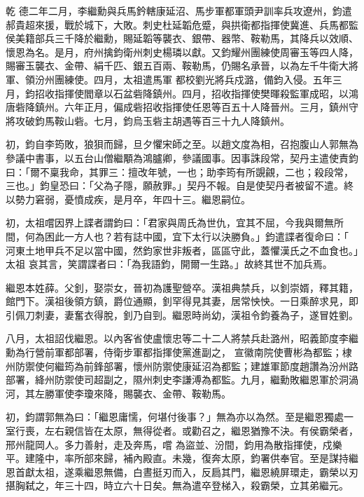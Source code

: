 \begin{pinyinscope}
 乾
 德二年二月，李繼勳與兵馬鈐轄康延沼、馬步軍都軍頭尹訓率兵攻遼州，鈞遣郝貴超來援，戰於城下，大敗。刺史杜延韜危蹙，與拱衛都指揮使冀進、兵馬都監侯美籍部兵三千降於繼勳，賜延韜等襲衣、銀帶、器幣、鞍勒馬，其降兵以效順、懷恩為名。是月，府州擒鈞衛州刺史楊璘以獻。又鈞耀州團練使周審玉等四人降，賜審玉襲衣、金帶、絹千匹、銀五百兩、鞍勒馬，仍賜名承晉，以為左千牛衛大將軍、領汾州團練使。四月，太祖遣馬軍
 都校劉光將兵戍潞，備鈞入侵。五年三月，鈞招收指揮使閻章以石盆砦降鎮州。四月，招收指揮使樊暉殺監軍成昭，以鴻唐砦降鎮州。六年正月，偏成砦招收指揮使任恩等百五十人降晉州。三月，鎮州守將攻破鈞馬鞍山砦。七月，鈞烏玉砦主胡遇等百三十九人降鎮州。



 初，鈞自李筠敗，狼狽而歸，旦夕懼宋師之至。以趙文度為相，召抱腹山人郭無為參議中書事，以五台山僧繼顒為鴻臚卿，參議國事。因事誅段常，契丹主遣使責鈞
 曰：「爾不稟我命，其罪三：擅改年號，一也；助李筠有所覬覦，二也；殺段常，三也。」鈞皇恐曰：「父為子隱，願赦罪。」契丹不報。自是使契丹者被留不遣。終以勢力窘弱，憂憤成疾，是月卒，年四十三。繼恩嗣位。



 初，太祖嚐因界上諜者謂鈞曰：「君家與周氏為世仇，宜其不屈，今我與爾無所間，何為困此一方人也？若有誌中國，宜下太行以決勝負。」鈞遣諜者復命曰：「 河東土地甲兵不足以當中國，然鈞家世非叛者，區區守此，蓋懼漢氏之不血食也。」太祖
 哀其言，笑謂諜者曰：「為我語鈞，開爾一生路。」故終其世不加兵焉。



 繼恩本姓薛。父釗，娶崇女，晉初為護聖營卒。漢祖典禁兵，以釗崇婿，釋其籍，館門下。漢祖後領方鎮，爵位通顯，釗罕得見其妻，居常怏怏。一日乘醉求見，即引佩刀刺妻，妻奮衣得脫，釗乃自剄。繼恩時尚幼，漢祖令鈞養為子，遂冒姓劉。



 八月，太祖詔伐繼恩。以內客省使盧懷忠等二十二人將禁兵赴潞州，昭義節度李繼勳為行營前軍都部署，侍衛步軍都指揮使黨進副之，
 宣徽南院使曹彬為都監；棣州防禦使何繼筠為前鋒部署，懷州防禦使康延沼為都監；建雄軍節度趙讚為汾州路部署，絳州防禦使司超副之，隰州刺史李謙溥為都監。九月，繼勳敗繼恩軍於洞渦河，其左勝軍使李瓊來降，賜襲衣、金帶、鞍勒馬。



 初，鈞謂郭無為曰：「繼恩庸懦，何堪付後事？」無為亦以為然。至是繼恩獨處一室行喪，左右親信皆在太原，無得從者。或勸召之，繼恩猶豫不決。有侯霸榮者，邢州龍岡人。多力善射，走及奔馬，嚐
 為盜並、汾間，鈞用為散指揮使，戍樂平。建隆中，率所部來歸，補內殿直。未幾，復奔太原，鈞署供奉官。至是謀持繼恩首獻太祖，遂乘繼恩無備，白晝挺刃而入，反扃其門，繼恩繞屏環走，霸榮以刃揕胸弑之，年三十四，時立六十日矣。無為遣卒登梯入，殺霸榮，立其弟繼元。




\end{pinyinscope}
